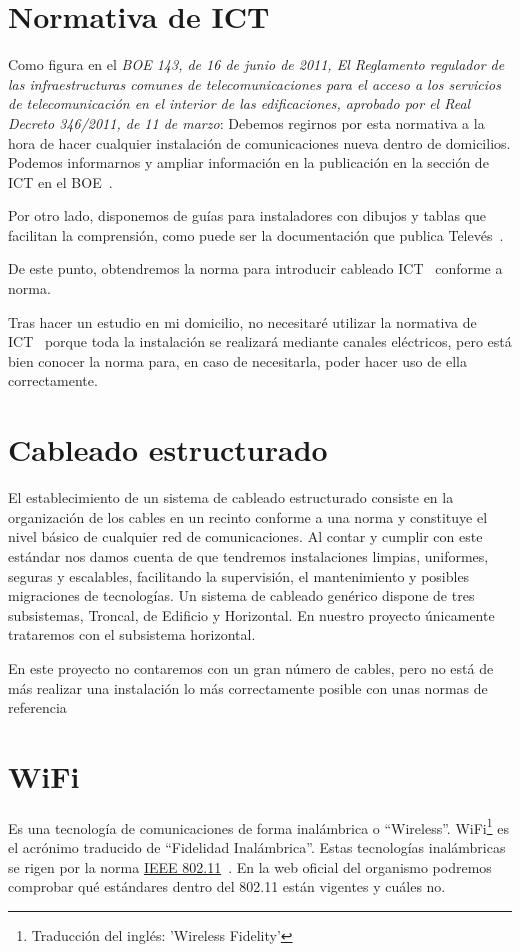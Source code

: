 \section{Normativa de ICT}\label{concepto:Normativa_ICT}
Como figura en el \textit{BOE 143, de 16 de junio de 2011, El Reglamento regulador de las infraestructuras comunes de telecomunicaciones para el acceso a los servicios de telecomunicación en el interior de las edificaciones, aprobado por el Real Decreto 346/2011, de 11 de marzo}:
Debemos regirnos por esta normativa a la hora de hacer cualquier instalación de comunicaciones nueva dentro de domicilios.
Podemos informarnos y ampliar información en la publicación en la sección de ICT en el BOE~\cite{manual:ICT}.

Por otro lado, disponemos de guías para instaladores con dibujos y tablas que facilitan la comprensión, como puede ser la documentación que publica Televés~\cite{manual:ICT-Televes}.

De este punto, obtendremos la norma para introducir cableado ICT~\cite{manual:ICT} conforme a norma.

Tras hacer un estudio en mi domicilio, no necesitaré utilizar la normativa de ICT~\cite{manual:ICT} porque toda la instalación se realizará mediante canales eléctricos, pero está bien conocer la norma para, en caso de necesitarla, poder hacer uso de ella correctamente.

\section{Cableado estructurado}\label{concepto:Cableado_estructurado}
El establecimiento de un sistema de cableado estructurado consiste en la organización de los cables en un recinto conforme a una norma y constituye el nivel básico de cualquier red de comunicaciones.
Al contar y cumplir con este estándar nos damos cuenta de que tendremos instalaciones limpias, uniformes, seguras y escalables, facilitando la supervisión, el mantenimiento y posibles migraciones de tecnologías.
Un sistema de cableado genérico dispone de tres subsistemas, Troncal, de Edificio y Horizontal. En nuestro proyecto únicamente trataremos con el subsistema horizontal.

En este proyecto no contaremos con un gran número de cables, pero no está de más realizar una instalación lo más correctamente posible con unas normas de referencia

\section{WiFi}\label{concepto:WIFI}
Es una tecnología de comunicaciones de forma inalámbrica o “Wireless”. WiFi\footnote{Traducción del inglés: 'Wireless Fidelity'} es el acrónimo traducido de “Fidelidad Inalámbrica”.
Estas tecnologías inalámbricas se rigen por la norma \underline{IEEE 802.11}~\cite{manual:IEEE802.11}.
En la web oficial del organismo podremos comprobar qué estándares dentro del 802.11 están vigentes y cuáles no.

